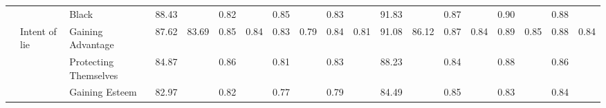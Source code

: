 \begin{table}[!tbh]
{\begin{tabular}{l|l|l|llllllll||llllllll}
                       &                                 & Black                   & \multicolumn{1}{l|}{88.43} & \multicolumn{1}{l|}{}                       & \multicolumn{1}{l|}{0.82} & \multicolumn{1}{l|}{}                      & \multicolumn{1}{l|}{0.85} & \multicolumn{1}{l|}{}                      & \multicolumn{1}{l|}{0.83} &                       & \multicolumn{1}{l|}{91.83} & \multicolumn{1}{l|}{}                       & \multicolumn{1}{l|}{0.87} & \multicolumn{1}{l|}{}                      & \multicolumn{1}{l|}{0.90} & \multicolumn{1}{l|}{}                      & \multicolumn{1}{l|}{0.88} &                       \\ \cline{2-19} 
                       & \multirow{6}{*}{Intent of lie}  & Gaining Advantage       & \multicolumn{1}{l|}{87.62} & \multicolumn{1}{l|}{\multirow{6}{*}{83.69}} & \multicolumn{1}{l|}{0.85} & \multicolumn{1}{l|}{\multirow{6}{*}{0.84}} & \multicolumn{1}{l|}{0.83} & \multicolumn{1}{l|}{\multirow{6}{*}{0.79}} & \multicolumn{1}{l|}{0.84} & \multirow{6}{*}{0.81} & \multicolumn{1}{l|}{91.08} & \multicolumn{1}{l|}{\multirow{6}{*}{86.12}} & \multicolumn{1}{l|}{0.87} & \multicolumn{1}{l|}{\multirow{6}{*}{0.84}} & \multicolumn{1}{l|}{0.89} & \multicolumn{1}{l|}{\multirow{6}{*}{0.85}} & \multicolumn{1}{l|}{0.88} & \multirow{6}{*}{0.84} \\ \cline{3-4} \cline{6-6} \cline{8-8} \cline{10-10} \cline{12-12} \cline{14-14} \cline{16-16} \cline{18-18}
                       &                                 & Protecting Themselves   & \multicolumn{1}{l|}{84.87} & \multicolumn{1}{l|}{}                       & \multicolumn{1}{l|}{0.86} & \multicolumn{1}{l|}{}                      & \multicolumn{1}{l|}{0.81} & \multicolumn{1}{l|}{}                      & \multicolumn{1}{l|}{0.83} &                       & \multicolumn{1}{l|}{88.23} & \multicolumn{1}{l|}{}                       & \multicolumn{1}{l|}{0.84} & \multicolumn{1}{l|}{}                      & \multicolumn{1}{l|}{0.88} & \multicolumn{1}{l|}{}                      & \multicolumn{1}{l|}{0.86} &                       \\ \cline{3-4} \cline{6-6} \cline{8-8} \cline{10-10} \cline{12-12} \cline{14-14} \cline{16-16} \cline{18-18}
                       &                                 & Gaining Esteem          & \multicolumn{1}{l|}{82.97} & \multicolumn{1}{l|}{}                       & \multicolumn{1}{l|}{0.82} & \multicolumn{1}{l|}{}                      & \multicolumn{1}{l|}{0.77} & \multicolumn{1}{l|}{}                      & \multicolumn{1}{l|}{0.79} &                       & \multicolumn{1}{l|}{84.49} & \multicolumn{1}{l|}{}                       & \multicolumn{1}{l|}{0.85} & \multicolumn{1}{l|}{}                      & \multicolumn{1}{l|}{0.83} & \multicolumn{1}{l|}{}                      & \multicolumn{1}{l|}{0.84} &                       \\ \cline{3-4} \cline{6-6} \cline{8-8} \cline{10-10} \cline{12-12} \cline{14-14} \cline{16-16} \cline{18-18}

\end{tabular}}
\end{table}
